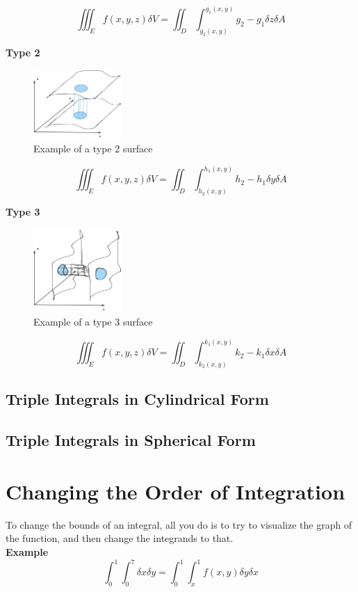 \documentclass{article}
\begin{document}
$$\iiint_E f(x, y, z) \delta V = \iint_D \int_{g_2(x, y)}^{g_1(x, y)} g_2 - g_1 \delta z \delta A$$

\textbf{Type 2}

\begin{figure}[H]
    \centering
    \includegraphics[width=0.3\textwidth]{figures/type2surfaces.png}
    \caption{Example of a type 2 surface}
\end{figure}

$$\iiint_E f(x, y, z) \delta V = \iint_D \int_{h_2(x, y)}^{h_1(x, y)} h_2 - h_1 \delta y \delta A$$

\textbf{Type 3}

\begin{figure}[H]
    \centering
    \includegraphics[width=0.3\textwidth]{figures/type3surfaces.png}
    \caption{Example of a type 3 surface}
\end{figure}

$$\iiint_E f(x, y, z) \delta V = \iint_D \int_{k_2(x, y)}^{k_1(x, y)} k_2 - k_1 \delta x \delta A$$


\subsection{Triple Integrals in Cylindrical Form}

\subsection{Triple Integrals in Spherical Form}



\section{Changing the Order of Integration}

To change the bounds of an integral, all you do is to try to visualize the graph of the function, and then change the integrands to that.\\
\textbf{Example}
$$\int_{0}^{1}\int_{0}^{7} \delta x \delta y = \int_{0}^{1} \int_{x}^{1} f(x, y) \delta y \delta x$$
\end{document}

